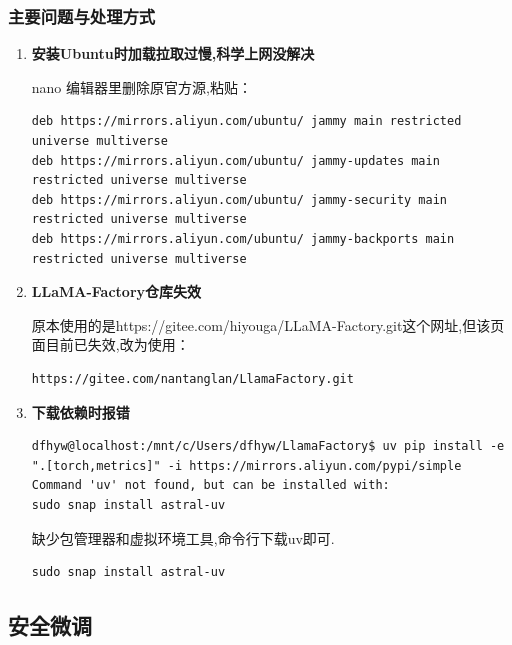 \documentclass[12pt]{ctexart}
\begin{document}
\subsubsection{主要问题与处理方式}

\begin{enumerate}

    \item \textbf{安装Ubuntu时加载拉取过慢,科学上网没解决}

          nano 编辑器里删除原官方源,粘贴：
          \begin{lstlisting}
deb https://mirrors.aliyun.com/ubuntu/ jammy main restricted universe multiverse
deb https://mirrors.aliyun.com/ubuntu/ jammy-updates main restricted universe multiverse
deb https://mirrors.aliyun.com/ubuntu/ jammy-security main restricted universe multiverse
deb https://mirrors.aliyun.com/ubuntu/ jammy-backports main restricted universe multiverse
          \end{lstlisting}

    \item \textbf{LLaMA-Factory仓库失效}

          原本使用的是https://gitee.com/hiyouga/LLaMA-Factory.git这个网址,但该页面目前已失效,改为使用：

          \begin{lstlisting}
https://gitee.com/nantanglan/LlamaFactory.git
          \end{lstlisting}

    \item \textbf{下载依赖时报错}

          \begin{lstlisting}
dfhyw@localhost:/mnt/c/Users/dfhyw/LlamaFactory$ uv pip install -e ".[torch,metrics]" -i https://mirrors.aliyun.com/pypi/simple
Command 'uv' not found, but can be installed with:
sudo snap install astral-uv
          \end{lstlisting}

          缺少包管理器和虚拟环境工具,命令行下载uv即可.

          \begin{lstlisting}
sudo snap install astral-uv
          \end{lstlisting}

\end{enumerate}

\subsection{安全微调}
\end{document}
